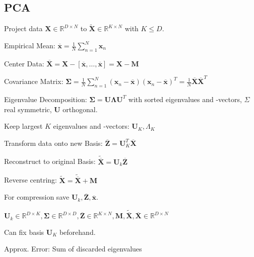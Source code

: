 \documentclass[a4paper, 11pt, landscape]{article}
\begin{document}
\begin{multicols*}{3}

\section{PCA}
Project data $\mathbf{X} \in \mathbb{R}^{D \times N}$ to $\tilde{\mathbf{X}} \in \mathbb{R}^{K \times N}$ with $K \leq D$.
\begin{compactenum}
	\item Empirical Mean: $\overline{\mathbf{x}} = \frac{1}{N} \sum_{n=1}^N \mathbf{x}_n$
	\item Center Data: $\overline{\mathbf{X}} = \mathbf{X} - [\overline{\mathbf{x}}, \ldots, \overline{\mathbf{x}}] = \mathbf{X} - \mathbf{M}$
	\item Covariance Matrix: $\boldsymbol{\Sigma} = \frac{1}{N	} \sum_{n=1}^N (\mathbf{x}_n - \overline{\mathbf{x}}) (\mathbf{x}_n - \overline{\mathbf{x}})^T = \frac{1}{N} \overline{\mathbf{X}}\overline{\mathbf{X}}^T$
	\item Eigenvalue Decomposition: $\boldsymbol{\Sigma} = \mathbf{U} \boldsymbol{\Lambda} \mathbf{U}^T$ with sorted eigenvalues and -vectors, $\Sigma$ real symmetric, $\mathbf{U}$ orthogonal.
	\item Keep largest $K$ eigenvalues and -vectors: $\mathbf{U}_K, \Lambda_K$
	\item Transform data onto new Basis: $\overline{\mathbf{Z}} = \mathbf{U}_K^T \overline{\mathbf{X}}$
	\item Reconstruct to original Basis: $\tilde{\overline{\mathbf{X}}} = \mathbf{U}_k \overline{\mathbf{Z}}$
	\item Reverse centring: $\tilde{\mathbf{X}} = \tilde{\overline{\mathbf{X}}} + \mathbf{M}$
\end{compactenum}

\begin{compactitem}
	\item For compression save $\mathbf{U}_k, \overline{\mathbf{Z}}, \overline{\mathbf{x}}$.
	\item $\mathbf{U}_k \in \mathbb{R}^{D \times K}, \boldsymbol{\Sigma} \in \mathbb{R}^{D \times D}, \overline{\mathbf{Z}} \in \mathbb{R}^{K \times N}, \mathbf{M},\tilde{\overline{\mathbf{X}}},\overline{\mathbf{X}} \in \mathbb{R}^{D \times N}$
	\item Can fix basis $\mathbf{U}_K$ beforehand.
\end{compactitem}

\begin{compactdesc}
	\item[Approx. Error:] Sum of discarded eigenvalues
\end{compactdesc}


\end{multicols*}
\end{document}
